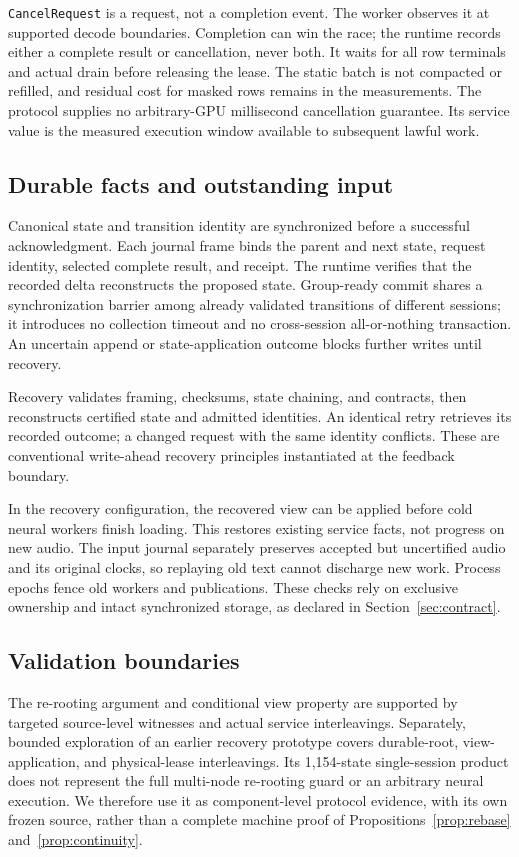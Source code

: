 \texttt{CancelRequest} is a request, not a completion event. The worker
observes it at supported decode boundaries. Completion can win the race;
the runtime records either a complete result or cancellation, never both.
It waits for all row terminals and actual drain before releasing the lease.
The static batch is not compacted or refilled, and residual cost for masked
rows remains in the measurements. The protocol supplies no arbitrary-GPU
millisecond cancellation guarantee. Its service value is the measured
execution window available to subsequent lawful work.

\subsection{Durable facts and outstanding input}
Canonical state and transition identity are synchronized before a successful
acknowledgment. Each journal frame binds the parent and next state, request
identity, selected complete result, and receipt. The runtime verifies that
the recorded delta reconstructs the proposed state. Group-ready commit
shares a synchronization barrier among already validated transitions of
different sessions; it introduces no collection timeout and no cross-session
all-or-nothing transaction. An uncertain append or state-application outcome
blocks further writes until recovery.

Recovery validates framing, checksums, state chaining, and contracts, then
reconstructs certified state and admitted identities. An identical retry
retrieves its recorded outcome; a changed request with the same identity
conflicts. These are conventional write-ahead recovery principles
\cite{mohan1992aries} instantiated at the feedback boundary.

In the recovery configuration, the recovered view can be applied before cold neural workers finish
loading. This restores existing service facts, not progress on new audio.
The input journal separately preserves accepted but uncertified audio and
its original clocks, so replaying old text cannot discharge new work.
Process epochs fence old workers and publications. These checks rely on
exclusive ownership and intact synchronized storage, as declared in
Section~\ref{sec:contract}.

\subsection{Validation boundaries}
The re-rooting argument and conditional view property are supported by
targeted source-level witnesses and actual service interleavings.
Separately, bounded exploration of an earlier recovery prototype covers
durable-root, view-application, and physical-lease interleavings. Its
1,154-state single-session product does not represent the full multi-node
re-rooting guard or an arbitrary neural execution. We therefore use it as
component-level protocol evidence, with its own frozen source, rather than
a complete machine proof of Propositions~\ref{prop:rebase}
and~\ref{prop:continuity}.

